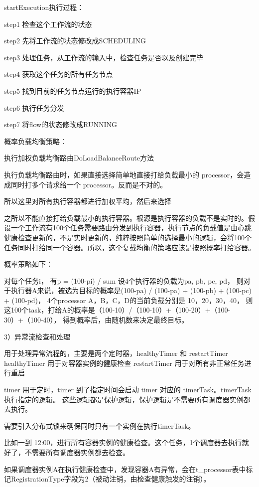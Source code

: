 startExecution执行过程：

step1 检查这个工作流的状态

step2 先将工作流的状态修改成SCHEDULING

step3 处理任务，从工作流的输入中，检查任务是否以及创建完毕

step4 获取这个任务的所有任务节点

step5 找到目前的任务节点运行的执行容器IP

step6 执行任务分发

step7 将flow的状态修改成RUNNING

概率负载均衡策略：

执行加权负载均衡路由DoLoadBalanceRoute方法

执行负载均衡路由时，如果直接选择简单地直接打给负载最小的 processor，会造成同时打多个请求给一个 processor。反而是不对的。

所以这里对所有执行容器都进行加权平均，然后来选择

之所以不能直接打给负载最小的执行容器。根源是执行容器的负载不是实时的。假设一个工作流有100个任务需要路由分发到执行容器，执行节点的负载值是由心跳
健康检查更新的，不是实时更新的，纯粹按照简单的选择最小的逻辑，会将100个任务同时打给同一个容器。所以，这个复载均衡的策略应该是按照概率打给容器。

概率策略如下：

对每个任务i， 有p = (100-pi) / sum
设4个执行器的负载为pa, pb, pc, pd，
则对于执行器A来说，被选为目标的概率是(100-pa) / (100-pa) + (100-pb) + (100-pc) + (100-pd)，
4个processor A，B，C，D的当前负载分别是 10，20，30，40，
则这100个task，打给A的概率是（100-10）/（100-10）+（100-20）+（100-30）+（100-40），
得到概率后，由随机数来决定最终目标。

3）异常流检查和处理

用于处理异常流程的，主要是两个定时器，healthyTimer 和 restartTimer
healthyTimer 用于对容器实例的健康检查
restartTimer 用于对所有非正常任务进行重启

timer 用于定时，timer 到了指定时间会启动 timer 对应的 timerTask。timerTask 执行指定的逻辑。
这些逻辑都是保护逻辑，保护逻辑是不需要所有调度器实例都去执行\cite{jyfw}。

需要引入分布式锁来确保同时只有一个实例在执行timerTask。

比如一到 12:00，进行所有容器实例的健康检查。这个任务，1个调度器去执行就好了，不需要所有调度器实例都去检查。

如果调度器实例A在执行健康检查中，发现容器A有异常，会在t\_processor表中标记RegistrationType字段为2（被动注销，由检查健康触发的注销）。


